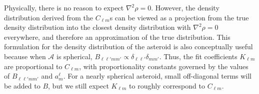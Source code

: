 \documentclass{aastex631}
\begin{document}
Physically, there is no reason to expect $\nabla^2 \rho = 0$. However, the density distribution derived from the $C_{\ell m}$s can be viewed as a projection from the true density distribution into the closest density distribution with $\nabla^2 \rho = 0$ everywhere, and therefore an approximation of the true distribution. This formulation for the density distribution of the asteroid is also conceptually useful because when $\mathcal{A}$ is spherical, $B_{\ell \ell' m m'} \propto \delta_{\ell \ell'} \delta_{m m'}$. Thus, the fit coefficients $K_{\ell m}$ are proportional to $C_{\ell m}$, with proportionality constants governed by the values of $B_{\ell \ell' m m'}$ and $a_m^\ell$. For a nearly spherical asteroid, small off-diagonal terms will be added to $B$, but we still expect $K_{\ell m}$ to roughly correspond to $C_{\ell m}$.
\end{document}
